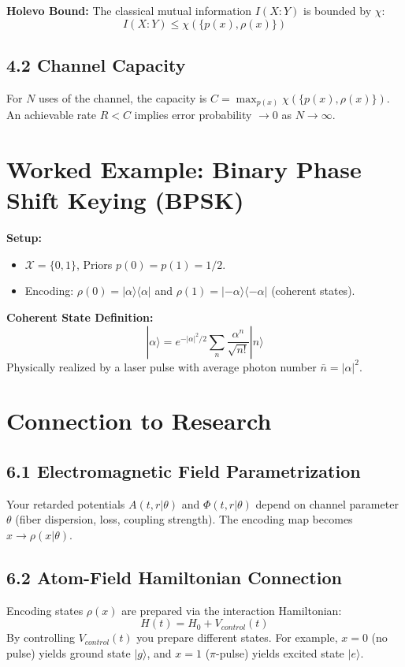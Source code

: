 \documentclass[12pt, a4paper]{article}
\begin{document}
\textbf{Holevo Bound:} The classical mutual information $I(X:Y)$ is bounded by $\chi$:
\begin{equation}
I(X:Y) \le \chi(\{p(x),\rho(x)\})
\end{equation}

\subsection{4.2 Channel Capacity}
For $N$ uses of the channel, the capacity is $C = \max_{p(x)}\chi(\{p(x),\rho(x)\})$. An achievable rate $R < C$ implies error probability $\to 0$ as $N \to \infty$.

\section{Worked Example: Binary Phase Shift Keying (BPSK)}
\textbf{Setup:}
\begin{itemize}
    \item $\mathcal{X}=\{0,1\}$, Priors $p(0)=p(1)=1/2$.
    \item Encoding: $\rho(0)=|\alpha\rangle\langle\alpha|$ and $\rho(1)=|-\alpha\rangle\langle-\alpha|$ (coherent states).
\end{itemize}

\textbf{Coherent State Definition:}
\begin{equation}
|\alpha\rangle = e^{-|\alpha|^{2}/2}\sum_{n}\frac{\alpha^{n}}{\sqrt{n!}}|n\rangle
\end{equation}
Physically realized by a laser pulse with average photon number $\bar{n}=|\alpha|^{2}$.

\section{Connection to Research}

\subsection{6.1 Electromagnetic Field Parametrization}
Your retarded potentials $A(t,r|\theta)$ and $\Phi(t,r|\theta)$ depend on channel parameter $\theta$ (fiber dispersion, loss, coupling strength). The encoding map becomes $x\rightarrow\rho(x|\theta)$.

\subsection{6.2 Atom-Field Hamiltonian Connection}
Encoding states $\rho(x)$ are prepared via the interaction Hamiltonian:
\begin{equation}
H(t)=H_{0}+V_{control}(t)
\end{equation}
By controlling $V_{control}(t)$ you prepare different states. For example, $x=0$ (no pulse) yields ground state $|g\rangle$, and $x=1$ ($\pi$-pulse) yields excited state $|e\rangle$.
\end{document}
